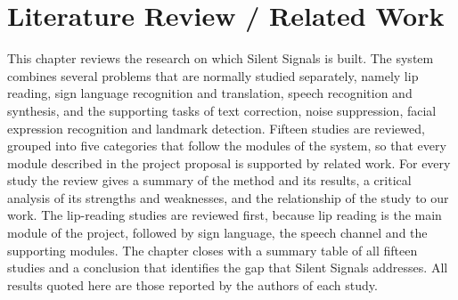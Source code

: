 \documentclass{FastFyp}
\begin{document}
\chapter{Literature Review / Related Work}
\label{ch:lit}
This chapter reviews the research on which Silent Signals is built. The system combines several problems that are normally studied separately, namely lip reading, sign language recognition and translation, speech recognition and synthesis, and the supporting tasks of text correction, noise suppression, facial expression recognition and landmark detection. Fifteen studies are reviewed, grouped into five categories that follow the modules of the system, so that every module described in the project proposal is supported by related work. For every study the review gives a summary of the method and its results, a critical analysis of its strengths and weaknesses, and the relationship of the study to our work. The lip-reading studies are reviewed first, because lip reading is the main module of the project, followed by sign language, the speech channel and the supporting modules. The chapter closes with a summary table of all fifteen studies and a conclusion that identifies the gap that Silent Signals addresses. All results quoted here are those reported by the authors of each study.
\end{document}
